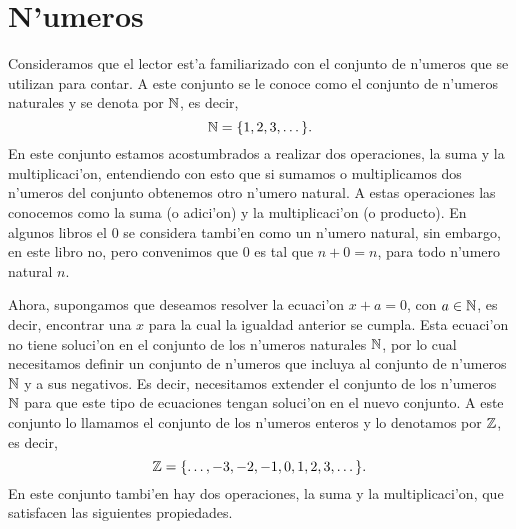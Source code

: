 \section{N'umeros}
\label{numeros}

\noindent Consideramos que el lector est'a familiarizado con el conjunto de 
n'umeros que se utilizan para contar. A este conjunto se le conoce como el 
conjunto de  n'umeros naturales y se denota por
$\mathbb{N}$, es decir, 
$$
     \mathbb{N} = \{1,2,3,\dots\}.
$$
En este conjunto estamos acostumbrados a realizar dos operaciones, la suma y la multiplicaci'on, 
entendiendo con esto que si sumamos o multiplicamos dos n'u\-meros del conjunto obtenemos otro n'umero natural. 
A estas operaciones las conocemos como la suma  (o adici'on) y la multiplicaci'on (o producto). En \linebreak algunos libros el 0 se considera tambi'en como un n'umero natural, sin embargo, en este libro no, pero convenimos que 0 es tal que $n+0=n$, para todo n'umero natural $n$. 

Ahora, supongamos que deseamos resolver la ecuaci'on $x+a = 0$, con $a\in \mathbb{N}$, es decir, encontrar una $x$ para la cual la igualdad anterior se cumpla.  
Esta ecuaci'on no tiene soluci'on en el conjunto de los n'umeros naturales $\mathbb{N}$, por lo cual necesitamos definir un conjunto de n'umeros que incluya al 
conjunto de n'umeros $\mathbb{N}$ y a sus negativos.  Es decir, necesitamos extender el conjunto de los n'umeros
$\mathbb{N}$ para que este tipo de ecuaciones tengan soluci'on en el nuevo conjunto.   A este  conjunto lo llamamos el conjunto de los  n'umeros enteros y lo  denotamos por $\mathbb{Z}$, es decir,
$$
     \mathbb{Z} = \{\dots, -3 ,-2, -1, 0, 1, 2, 3,\dots\}.
$$
En este conjunto tambi'en hay dos operaciones, la suma y la
multiplicaci'on,  que satisfacen las siguientes propiedades.


